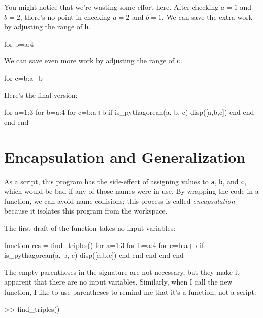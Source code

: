 You might notice that we're wasting some effort here.
After checking $a=1$ and $b=2$, there's no point in checking
$a=2$ and $b=1$.  We can save the extra work by adjusting the
range of {\tt b}.

\begin{code}
for b=a:4
\end{code}

We can save even more work by adjusting the range of {\tt c}.

\begin{code}
for c=b:a+b
\end{code}

Here's the final version:

\begin{code}
for a=1:3
    for b=a:4
        for c=b:a+b
            if is_pythagorean(a, b, c)
                disp([a,b,c])
            end
        end
    end
end
\end{code}

\section{Encapsulation and Generalization}

As a script, this program has the side-effect of assigning values to
{\tt a}, {\tt b}, and {\tt c}, which would be bad if any of those names were in use.  
By wrapping the code in a function, we can avoid name collisions; this process is called {\em encapsulation} because it isolates this program from the workspace.


The first draft of the function takes no input variables:

\begin{code}
function res = find_triples()
    for a=1:3
        for b=a:4
            for c=b:a+b
                if is_pythagorean(a, b, c)
                    disp([a,b,c])
                end
            end
        end
    end
end
\end{code}

The empty parentheses in the signature are not necessary, but
they make it apparent that there are no input variables.  Similarly,
when I call the new function, I like to use parentheses to remind me
that it's a function, not a script:

\begin{code}
>> find_triples()
\end{code}


